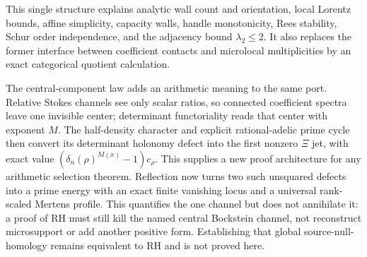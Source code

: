 \documentclass[11pt,a4paper]{amsart}
\theoremstyle{plain}
\theoremstyle{definition}
\begin{document}
This single structure explains analytic wall count and orientation, local Lorentz bounds, affine
simplicity, capacity walls, handle
monotonicity, Rees stability, Schur order independence, and the adjacency bound
$\lambda_2\leq2$.  It also replaces the former interface between coefficient contacts and
microlocal multiplicities by an exact categorical quotient calculation.

The central-component law adds an arithmetic meaning to the same port.  Relative Stokes channels
see only scalar ratios, so connected coefficient spectra leave one invisible center; determinant
functoriality reads that center with exponent $M$.  The half-density character and explicit
rational-adelic prime cycle then convert its determinant holonomy defect into the first nonzero
$\Xi$ jet, with exact value $(\delta_n(\rho)^{M(x)}-1)c_\rho$.  This supplies a new proof
architecture for any arithmetic selection theorem.  Reflection now turns two such unsquared
defects into a prime energy with an exact finite vanishing locus and a universal rank-scaled
Mertens profile.  This quantifies the one channel but does not annihilate it: a proof of RH must
still kill the named central Bockstein channel, not reconstruct microsupport or add another
positive form.  Establishing that global source-null-homology remains equivalent to RH and is not
proved here.
\end{document}
